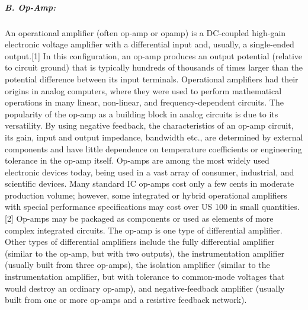 \subparagraph{B. Op-Amp: }
An operational amplifier (often op-amp or opamp) is a DC-coupled high-gain electronic 
voltage amplifier with a differential input and, usually, a single-ended output.[1] In 
this configuration, an op-amp produces an output potential (relative to circuit ground) 
that is typically hundreds of thousands of times larger than the potential difference 
between its input terminals. Operational amplifiers had their origins in analog computers, 
where they were used to perform mathematical operations in many linear, non-linear, and 
frequency-dependent circuits.
The popularity of the op-amp as a building block in analog circuits is due to its 
versatility. By using negative feedback, the characteristics of an op-amp circuit, its 
gain, input and output impedance, bandwidth etc., are determined by external components 
and have little dependence on temperature coefficients or engineering tolerance in the 
op-amp itself.
Op-amps are among the most widely used electronic devices today, being used in a vast 
array of consumer, industrial, and scientific devices. Many standard IC op-amps cost 
only a few cents in moderate production volume; however, some integrated or hybrid 
operational amplifiers with special performance specifications may cost over US 100 in 
small quantities.[2] Op-amps may be packaged as components or used as elements of more 
complex integrated circuits.
The op-amp is one type of differential amplifier. Other types of differential amplifiers 
include the fully differential amplifier (similar to the op-amp, but with two outputs), 
the instrumentation amplifier (usually built from three op-amps), the isolation amplifier 
(similar to the instrumentation amplifier, but with tolerance to common-mode voltages 
that would destroy an ordinary op-amp), and negative-feedback amplifier (usually built 
from one or more op-amps and a resistive feedback network).

